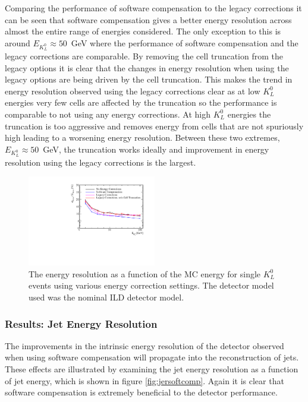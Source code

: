 Comparing the performance of software compensation to the legacy corrections it can be seen that software compensation gives a better energy resolution across almost the entire range of energies considered.  The only exception to this is around $E_{K^{0}_{L}} \approx 50$~GeV where the performance of software compensation and the legacy corrections are comparable.  By removing the cell truncation from the legacy options it is clear that the changes in energy resolution when using the legacy options are being driven by the cell truncation.  This makes the trend in energy resolution observed using the legacy corrections clear as at low $K^{0}_{L}$ energies very few cells are affected by the truncation so the performance is comparable to not using any energy corrections.  At high $K^{0}_{L}$ energies the truncation is too aggressive and removes energy from cells that are not spuriously high leading to a worsening energy resolution.  Between these two extremes, $E_{K^{0}_{L}} \approx 50$~GeV, the truncation works ideally and improvement in energy resolution using the legacy corrections is the largest.  

\begin{figure}[h!]
\includegraphics[width=0.5\textwidth]{EnergyEstimators/Plots/SoftComp/EnergyResolution/ER_vs_Kaon0LSoftComp_Kaon0L.pdf}
\caption[The energy resolution as a function of the MC energy for single $K^{0}_{L}$ events using various energy correction settings.  The detector model used was the nominal ILD detector model.]{The energy resolution as a function of the MC energy for single $K^{0}_{L}$ events using various energy correction settings.  The detector model used was the nominal ILD detector model.}
\label{fig:ersoftcomp}
\end{figure}


\subsubsection{Results: Jet Energy Resolution}
The improvements in the intrinsic energy resolution of the detector observed when using software compensation will propagate into the reconstruction of jets.  These effects are illustrated by examining the jet energy resolution as a function of jet energy, which is shown in figure \ref{fig:jersoftcomp}.  Again it is clear that software compensation is extremely beneficial to the detector performance.  

